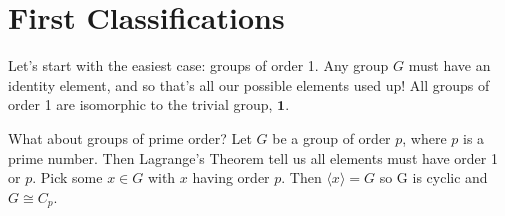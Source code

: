 \section{First Classifications}
Let's start with the easiest case: groups of order 1.
Any group \(G\) must have an identity element, and so that's all our possible elements used up!
All groups of order 1 are isomorphic to the trivial group, \(\bm{1}\).

What about groups of prime order?
Let \(G\) be a group of order \(p\), where \(p\) is a prime number.
Then Lagrange's Theorem tell us all elements must have order 1 or \(p\).
Pick some \(x \in G\) with \(x\) having order \(p\).
Then \(\langle x \rangle = G\) so G is cyclic and \(G \cong C_p\).
